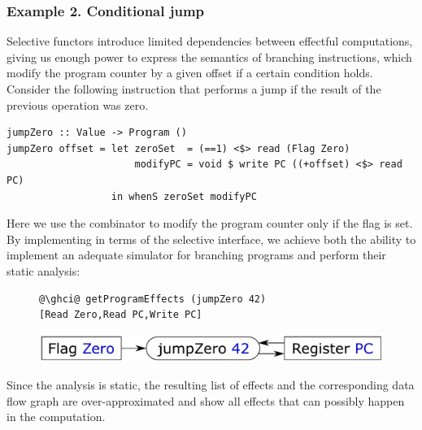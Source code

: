 \subsubsection{Example 2. Conditional jump}

Selective functors introduce limited dependencies between effectful
computations, giving us enough power to express the semantics of branching
instructions, which modify the program counter by a given offset if a certain
condition holds. Consider the following instruction that performs a jump if the
result of the previous operation was zero.

\vspace{1mm}
\begin{verbatim}
jumpZero :: Value -> Program ()
jumpZero offset = let zeroSet  = (==1) <$> read (Flag Zero)
                      modifyPC = void $ write PC ((+offset) <$> read PC)
                  in whenS zeroSet modifyPC
\end{verbatim}
\vspace{1mm}

\noindent
Here we use the  combinator to modify the program counter only if
the  flag is set. By implementing  in terms of the
selective interface, we achieve both the ability to implement an adequate
simulator for branching programs and perform their static analysis:

\begin{figure}[!h]
 \begin{minipage}{0.45\textwidth}
\raggedleft
\begin{verbatim}
@\ghci@ getProgramEffects (jumpZero 42)
[Read Zero,Read PC,Write PC]
\end{verbatim}
 \end{minipage}
 \begin{minipage}{0.54\textwidth}
  \centering
  \includegraphics[scale=0.3]{fig/jumpZero.pdf}
 \end{minipage}
\end{figure}

\noindent
Since the analysis is static, the resulting list of effects and the
corresponding data flow graph are over-approximated and show all effects that
can possibly happen in the computation.


